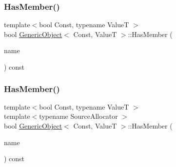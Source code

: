 \mbox{\label{classGenericObject_a996d775e52cc7c5cf2aa308cf5a2b2cf}} 
\subsubsection{\texorpdfstring{Has\+Member()}{HasMember()}\hspace{0.1cm}{\footnotesize\ttfamily [1/2]}}
{\footnotesize\ttfamily template$<$bool Const, typename ValueT $>$ \\
bool \hyperlink{classGenericObject}{Generic\+Object}$<$ Const, ValueT $>$\+::Has\+Member (\begin{DoxyParamCaption}\item[{\hyperlink{classGenericObject_af70c9646b5e422306c33e98b3d8783a7}{const} \hyperlink{classGenericObject_ac6747e5baa13e15bcea1658b5624647a}{Ch} $\ast$}]{name }\end{DoxyParamCaption}) const\hspace{0.3cm}{\ttfamily [inline]}}

\mbox{\label{classGenericObject_a0b63666ca05c86f9d719350f2302a3f7}} 
\subsubsection{\texorpdfstring{Has\+Member()}{HasMember()}\hspace{0.1cm}{\footnotesize\ttfamily [2/2]}}
{\footnotesize\ttfamily template$<$bool Const, typename ValueT $>$ \\
template$<$typename Source\+Allocator $>$ \\
bool \hyperlink{classGenericObject}{Generic\+Object}$<$ Const, ValueT $>$\+::Has\+Member (\begin{DoxyParamCaption}\item[{\hyperlink{classGenericObject_af70c9646b5e422306c33e98b3d8783a7}{const} \hyperlink{classGenericValue}{Generic\+Value}$<$ \hyperlink{classGenericObject_a96ebfdde095e2ce42535d15ae5dc58ef}{Encoding\+Type}, Source\+Allocator $>$ \&}]{name }\end{DoxyParamCaption}) const\hspace{0.3cm}{\ttfamily [inline]}}

